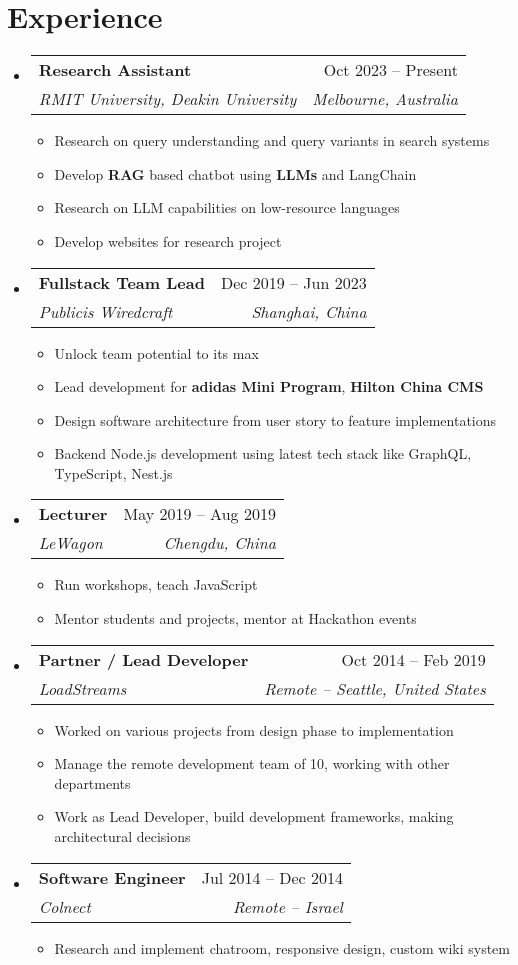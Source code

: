 \documentclass[a4paper,11pt]{article}
\makeatletter
\newcommand{\resumeItem}[1]{
  \item\small{#1}
}
\newcommand{\resumeItemListStart}{\begin{itemize}[rightmargin=0.11in]}
\newcommand{\resumeItemListEnd}{\end{itemize}}
\newcommand{\resumeQuadHeading}[4]{
  \item
  \begin{tabular*}{0.96\textwidth}[t]{l@{\extracolsep{\fill}}r}
    \textbf{#1} & #2 \\
    \textit{\small#3} & \textit{\small #4} \\
  \end{tabular*}
}
\newcommand{\resumeHeadingListStart}{
  \begin{itemize}[leftmargin=0.15in, label={}]
}
\newcommand{\resumeHeadingListEnd}{\end{itemize}}
\makeatother
\begin{document}

\section{Experience}
\resumeHeadingListStart{}
  \resumeQuadHeading{Research Assistant}{Oct 2023 -- Present}
  {RMIT University, Deakin University}{Melbourne, Australia}
    \resumeItemListStart{}
      \resumeItem{Research on query understanding and query variants in search systems}
      \resumeItem{Develop \textbf{RAG} based chatbot using \textbf{LLMs} and LangChain}
      \resumeItem{Research on LLM capabilities on low-resource languages}
      \resumeItem{Develop websites for research project}
    \resumeItemListEnd{}

  \resumeQuadHeading{Fullstack Team Lead}{Dec 2019 -- Jun 2023}
  {Publicis Wiredcraft}{Shanghai, China}
    \resumeItemListStart{}
      \resumeItem{Unlock team potential to its max}
      \resumeItem{Lead development for \textbf{adidas Mini Program}, \textbf{Hilton China CMS}}
      \resumeItem{Design software architecture from user story to feature implementations}
      \resumeItem{Backend Node.js development using latest tech stack like GraphQL, TypeScript, Nest.js}
    \resumeItemListEnd{}

  \resumeQuadHeading{Lecturer}{May 2019 -- Aug 2019}
  {LeWagon}{Chengdu, China}
    \resumeItemListStart{}
      \resumeItem{Run workshops, teach JavaScript}
      \resumeItem{Mentor students and projects, mentor at Hackathon events}
    \resumeItemListEnd{}

  \resumeQuadHeading{Partner / Lead Developer}{Oct 2014 -- Feb 2019}
  {LoadStreams}{Remote -- Seattle, United States}
    \resumeItemListStart{}
      \resumeItem{Worked on various projects from design phase to implementation}
      \resumeItem{Manage the remote development team of 10, working with other departments}
      \resumeItem{Work as Lead Developer, build development frameworks, making architectural decisions}
    \resumeItemListEnd{}

  \resumeQuadHeading{Software Engineer}{Jul 2014 -- Dec 2014}
  {Colnect}{Remote -- Israel}
    \resumeItemListStart{}
      \resumeItem{Research and implement chatroom, responsive design, custom wiki system}
    \resumeItemListEnd{}
\resumeHeadingListEnd{}
\end{document}
